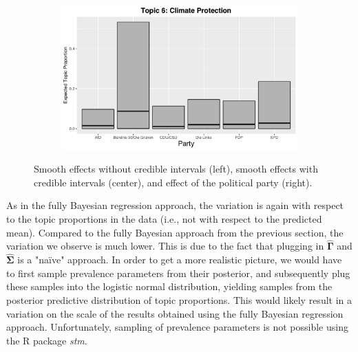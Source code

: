 \begin{figure}[h!]
\begin{subfigure}[b]{0.3\linewidth}
  \end{subfigure}
  \begin{subfigure}[b]{0.3\linewidth}
    \includegraphics[width=\linewidth]{../plots/5_1/direct_t6_cat.pdf}
  \end{subfigure}
  \caption{Smooth effects without credible intervals (left), smooth effects with credible intervals (center), and effect of the political party (right).}
  \label{fig:directassessment}
\end{figure}

As in the fully Bayesian regression approach, the variation is again with respect to the topic proportions in the data (i.e., not with respect to the predicted mean). Compared to the fully Bayesian approach from the previous section, the variation we observe is much lower. This is due to the fact that plugging in $\hat{\boldsymbol{\Gamma}}$ and $\hat{\boldsymbol{\Sigma}}$ is a "na{\"i}ve" approach. In order to get a more realistic picture, we would have to first sample prevalence parameters from their posterior, and subsequently plug these samples into the logistic normal distribution, yielding samples from the posterior predictive distribution of topic proportions. This would likely result in a variation on the scale of the results obtained using the fully Bayesian regression approach. Unfortunately, sampling of prevalence parameters is not possible using the R package \textit{stm}. 
